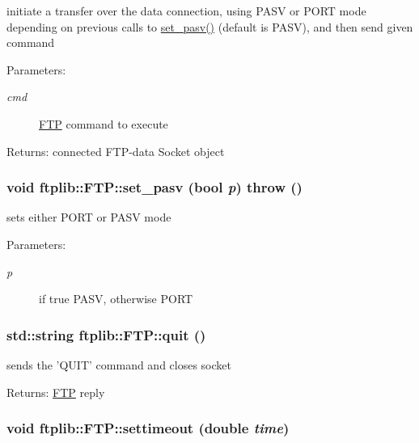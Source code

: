 initiate a transfer over the data connection, using PASV or PORT mode depending on previous calls to \hyperlink{classftplib_1_1FTP_e35230239f093f01fb295ccb007de1b2}{set\_\-pasv()} (default is PASV), and then send given command 

\begin{Desc}
\item[Parameters:]
\begin{description}
\item[{\em cmd}]\hyperlink{classftplib_1_1FTP}{FTP} command to execute \end{description}
\end{Desc}
\begin{Desc}
\item[Returns:]connected FTP-data Socket object \end{Desc}
\hypertarget{classftplib_1_1FTP_e35230239f093f01fb295ccb007de1b2}{
\subsubsection{\setlength{\rightskip}{0pt plus 5cm}void ftplib::FTP::set\_\-pasv (bool {\em p})  throw ()}}
\label{classftplib_1_1FTP_e35230239f093f01fb295ccb007de1b2}


sets either PORT or PASV mode 

\begin{Desc}
\item[Parameters:]
\begin{description}
\item[{\em p}]if true PASV, otherwise PORT \end{description}
\end{Desc}
\hypertarget{classftplib_1_1FTP_bd6e018a5cc17b1c8007064830823c71}{
\subsubsection{\setlength{\rightskip}{0pt plus 5cm}std::string ftplib::FTP::quit ()}}
\label{classftplib_1_1FTP_bd6e018a5cc17b1c8007064830823c71}


sends the 'QUIT' command and closes socket 

\begin{Desc}
\item[Returns:]\hyperlink{classftplib_1_1FTP}{FTP} reply \end{Desc}
\hypertarget{classftplib_1_1FTP_a6603cda3b7c44c48c6a2b8d688d3bb7}{
\subsubsection{\setlength{\rightskip}{0pt plus 5cm}void ftplib::FTP::settimeout (double {\em time})}}
\label{classftplib_1_1FTP_a6603cda3b7c44c48c6a2b8d688d3bb7}


